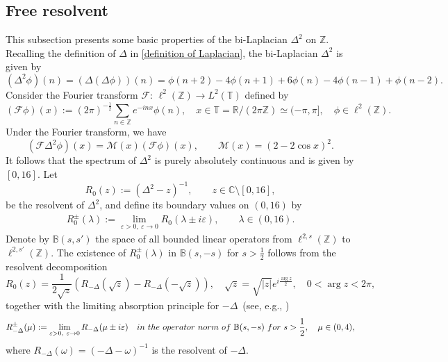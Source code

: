 \documentclass[10pt,a4paper]{amsart}
\newcommand\R{\mathbb{R}}
\newcommand\Z{\mathbb{Z}}
\newcommand\B{\mathbb{B}}
\newcommand\C{\mathbb{C}}
\newcommand\T{\mathbb{T}}
\newcommand\mcaF{\mathcal{F}}
\newcommand\mcaM{\mathcal{M}}
\numberwithin{equation}{section}
\begin{document}
\subsection{Free resolvent}\label{Subsec of free resol}
This subsection presents some basic properties of the  bi-Laplacian $\Delta^2$ on $\Z$. 
Recalling the definition of $\Delta$ in \eqref{definition of Laplacian}, the bi-Laplacian $\Delta^2$ is given by 
\begin{equation*}
(\Delta^2\phi)(n)=(\Delta(\Delta\phi))(n)=\phi(n+2)-4\phi(n+1)+6\phi(n)-4\phi(n-1)+\phi(n-2).
\end{equation*}
Consider the Fourier transform $\mcaF$: $\ell^2(\Z)\rightarrow L^2(\T)$ defined by
\begin{equation}\label{fourier transform}
(\mcaF\phi)(x):=(2\pi)^{-{\frac{1}{2}}}\sum_{n\in\Z}^{}e^{-inx}\phi(n), \quad x\in\T=\R/(2\pi\Z)\simeq(-\pi,\pi],\quad  \phi\in\ell^2(\Z).
\end{equation}
Under the Fourier transform, we have
\begin{equation}\label{unitary equivalent}
(\mcaF\Delta^2\phi)(x)=\mcaM(x)(\mcaF\phi)(x),\qquad \mcaM(x)=(2-2 \cos x)^2.
\end{equation}
It follows that the spectrum of $\Delta^2$ is purely absolutely
continuous and is given by $[0,16]$.
Let
  $$R_0(z):=(\Delta^2-z)^{-1},\qquad z\in\C\setminus[0,16],$$
  be the resolvent of $\Delta^2$, and define its boundary values on $(0,16)$ by
  \begin{align*}
  R^{\pm}_{0}(\lambda):=\lim\limits_{\varepsilon>0,\ \varepsilon\rightarrow0 }R_{0}(\lambda\pm i\varepsilon ),\qquad\lambda\in(0,16).
  \end{align*}
   Denote by $\B(s,s')$ the space of all bounded linear operators from $\ell^{2,s}(\Z)$ to $\ell^{2,s'}(\Z)$. The existence of $R^{\pm}_0(\lambda)$ in  $\B(s,-s)$ for $s>\frac{1}{2}$ follows from the resolvent decomposition
\begin{equation}\label{unity partition}
 R_0(z)=\frac{1}{2\sqrt z}\left(R_{-\Delta}(\sqrt z)-R_{-\Delta}(-\sqrt z)\right),\quad\sqrt{z}=\sqrt{|z|}e^{i\frac{\arg z}{2}},\quad  0<\arg z<2\pi,
 \end{equation}
together with the limiting absorption principle for $-\Delta$~(see, e.g., \cite[Lemma 3.1]{KKK06})
  $$R^{\pm}_{-\Delta}(\mu):=\lim\limits_{\varepsilon>0,\ \varepsilon\rightarrow0}R_{-\Delta}(\mu\pm i\varepsilon )\quad {\rm in\ the\ operator\ norm\ of }\ \B(s,-s)\ {\rm for}\ s>\frac{1}{2},\quad \mu\in(0,4),$$
where $R_{-\Delta}(\omega)=(-\Delta-\omega)^{-1}$ is the resolvent of $-\Delta$.
\end{document}
